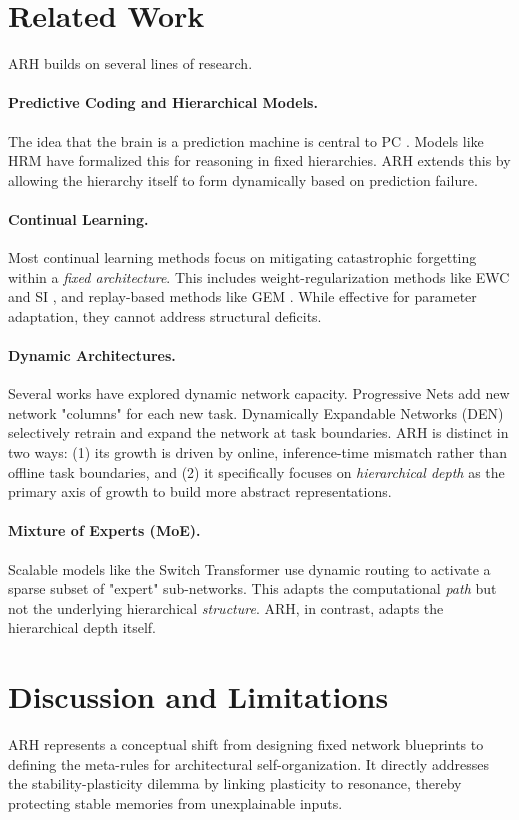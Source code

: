 \documentclass{article}
\begin{document}
\section{Related Work}
ARH builds on several lines of research.
\paragraph{Predictive Coding and Hierarchical Models.} The idea that the brain is a prediction machine is central to PC \citep{Rao1999}. Models like HRM \citep{HRM2025} have formalized this for reasoning in fixed hierarchies. ARH extends this by allowing the hierarchy itself to form dynamically based on prediction failure.
\paragraph{Continual Learning.} Most continual learning methods focus on mitigating catastrophic forgetting within a \emph{fixed architecture}. This includes weight-regularization methods like EWC \citep{ewc2017} and SI \citep{si2017}, and replay-based methods like GEM \citep{gem2017}. While effective for parameter adaptation, they cannot address structural deficits.
\paragraph{Dynamic Architectures.} Several works have explored dynamic network capacity. Progressive Nets \citep{rusu2016} add new network "columns" for each new task. Dynamically Expandable Networks (DEN) \citep{den2018} selectively retrain and expand the network at task boundaries. ARH is distinct in two ways: (1) its growth is driven by online, inference-time mismatch rather than offline task boundaries, and (2) it specifically focuses on \emph{hierarchical depth} as the primary axis of growth to build more abstract representations.
\paragraph{Mixture of Experts (MoE).} Scalable models like the Switch Transformer \citep{switch2021} use dynamic routing to activate a sparse subset of "expert" sub-networks. This adapts the computational \emph{path} but not the underlying hierarchical \emph{structure}. ARH, in contrast, adapts the hierarchical depth itself.

\section{Discussion and Limitations}
ARH represents a conceptual shift from designing fixed network blueprints to defining the meta-rules for architectural self-organization. It directly addresses the stability-plasticity dilemma by linking plasticity to resonance, thereby protecting stable memories from unexplainable inputs.
\end{document}

